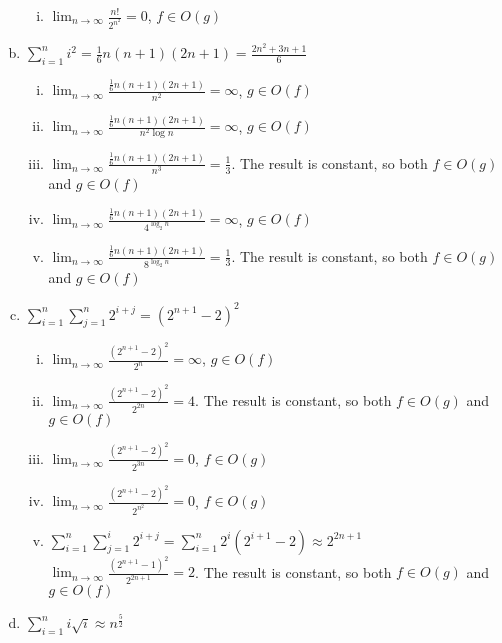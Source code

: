 \documentclass{article}
\def\math#1{$#1$}
\begin{document}
\begin{enumerate}[(a)]
\begin{enumerate}[i)]
            \item \math{\lim_{n \to \infty} \frac{n!}{2^{n^2}} = 0}, \math{f \in O(g)}
         \end{enumerate}
    \item \math{\sum_{i=1}^n i^2 = \frac{1}{6}n(n+1)(2n+1) = \frac{2n^2+3n+1}{6}}
         \begin{enumerate}[i)]
             \item \math{\lim_{n \to \infty} \frac{\frac{1}{6}n(n+1)(2n+1)}{n^2} = \infty}, \math{g \in O(f)}
            \item \math{\lim_{n \to \infty} \frac{\frac{1}{6}n(n+1)(2n+1)}{n^2 \log n} = \infty}, \math{g \in O(f)}
            \item \math{\lim_{n \to \infty} \frac{\frac{1}{6}n(n+1)(2n+1)}{n^3} = \frac{1}{3}}. The result is constant, so both \math{f \in O(g)} and \math{g \in O(f)}
            \item \math{\lim_{n \to \infty} \frac{\frac{1}{6}n(n+1)(2n+1)}{4^{ \log_2 n}} = \infty}, \math{g \in O(f)}
            \item \math{\lim_{n \to \infty} \frac{\frac{1}{6}n(n+1)(2n+1)}{8^{ \log_2 n}} = \frac{1}{3}}. The result is constant, so both \math{f \in O(g)} and \math{g \in O(f)}
         \end{enumerate}
    \item \math{\sum_{i=1}^n \sum_{j=1}^n 2^{i+j} = (2^{n+1} - 2)^2}
         \begin{enumerate}[i)]
            \item \math{\lim_{n \to \infty} \frac{(2^{n+1} - 2)^2}{2^n} = \infty}, \math{g \in O(f)}
            \item \math{\lim_{n \to \infty} \frac{(2^{n+1} - 2)^2}{2^{2n}} = 4}. The result is constant, so both \math{f \in O(g)} and \math{g \in O(f)}
            \item \math{\lim_{n \to \infty} \frac{(2^{n+1} - 2)^2}{2^{3n}} = 0}, \math{f \in O(g)}
            \item \math{\lim_{n \to \infty} \frac{(2^{n+1} - 2)^2}{2^{n^2}} = 0}, \math{f \in O(g)}
            \item \math{\sum_{i=1}^n \sum_{j=1}^i 2^{i+j} = \sum_{i=1}^n 2^i (2^{i + 1} - 2) %
            \approx 2^{2n+1}}\\ \math{\lim_{n \to \infty} \frac{(2^{n+1} - 1)^2}{2^{2n+1}} = 2}. The result is constant, so both \math{f \in O(g)} and \math{g \in O(f)}
         \end{enumerate}
    \item \math{\sum_{i=1}^n i\sqrt{i} \approx n^{\frac{5}{2}}}

\end{enumerate}
\end{document}

